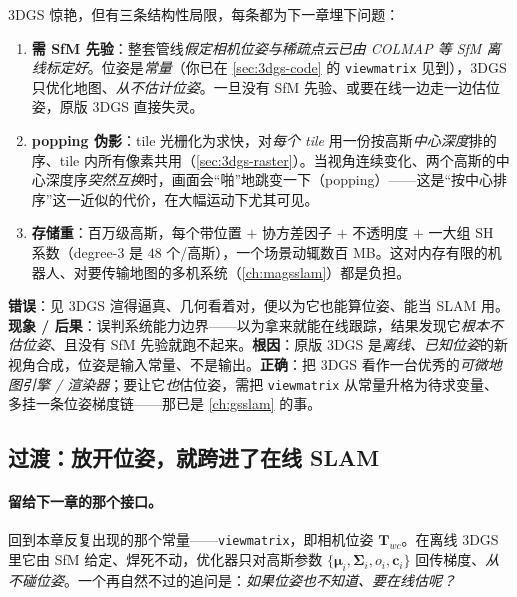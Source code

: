 3DGS 惊艳，但有三条结构性局限，每条都为下一章埋下问题：

\begin{enumerate}
  \item \textbf{需 SfM 先验}：整套管线\emph{假定相机位姿与稀疏点云已由 COLMAP 等 SfM 离线标定好}。位姿是\emph{常量}（你已在 \cref{sec:3dgs-code} 的 \texttt{viewmatrix} 见到），3DGS 只优化地图、\emph{从不估计位姿}。一旦没有 SfM 先验、或要在线一边走一边估位姿，原版 3DGS 直接失灵。
  \item \textbf{popping 伪影}：tile 光栅化为求快，对\emph{每个 tile} 用一份按高斯\emph{中心深度}排的序、tile 内所有像素共用（\cref{sec:3dgs-raster}）。当视角连续变化、两个高斯的中心深度序\emph{突然互换}时，画面会“啪”地跳变一下（popping）——这是“按中心排序”这一近似的代价，在大幅运动下尤其可见。
  \item \textbf{存储重}：百万级高斯，每个带位置 $+$ 协方差因子 $+$ 不透明度 $+$ 一大组 SH 系数（degree-3 是 $48$ 个/高斯），一个场景动辄数百 MB。这对内存有限的机器人、对要传输地图的多机系统（\cref{ch:magsslam}）都是负担。
\end{enumerate}

\begin{pitfall}
\textbf{错误}：见 3DGS 渲得逼真、几何看着对，便以为它也能算位姿、能当 SLAM 用。\textbf{现象 / 后果}：误判系统能力边界——以为拿来就能在线跟踪，结果发现它\emph{根本不估位姿}、且没有 SfM 先验就跑不起来。\textbf{根因}：原版 3DGS 是\emph{离线、已知位姿}的新视角合成，位姿是输入常量、不是输出。\textbf{正确}：把 3DGS 看作一台优秀的\emph{可微地图引擎 / 渲染器}；要让它\emph{也}估位姿，需把 \texttt{viewmatrix} 从常量升格为待求变量、多挂一条位姿梯度链——那已是 \cref{ch:gsslam} 的事。
\end{pitfall}

\subsection{过渡：放开位姿，就跨进了在线 SLAM}

\paragraph{留给下一章的那个接口。}
回到本章反复出现的那个常量——\texttt{viewmatrix}，即相机位姿 $\mathbf T_{wc}$。在离线 3DGS 里它由 SfM 给定、焊死不动，优化器只对高斯参数 $\{\boldsymbol\mu_i,\boldsymbol\Sigma_i,o_i,\mathbf c_i\}$ 回传梯度、\emph{从不碰位姿}。一个再自然不过的追问是：\emph{如果位姿也不知道、要在线估呢？}

